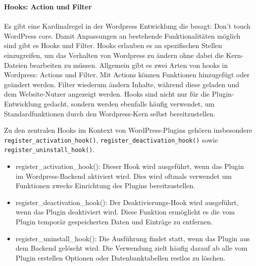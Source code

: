 \newpage
\textbf{Hooks: Action und Filter}\\\\
Es gibt eine Kardinalregel in der Wordpress Entwicklung die besagt: Don’t touch WordPress core. %
Damit Anpassungen an bestehende Funktionalitäten möglich sind gibt es Hooks und Filter.
Hooks erlauben es an spezifischen Stellen einzugreifen, um das Verhalten von Wordpress zu ändern ohne dabei die Kern-Dateien bearbeiten zu müssen.
Allgemein gibt es zwei Arten von hooks in Wordpress: Actions und Filter.
Mit Actions können Funktionen hinzugefügt oder geändert werden.
Filter wiederum ändern Inhalte, während diese geladen und dem Website-Nutzer angezeigt werden.
Hooks sind nicht nur für die Plugin-Entwicklung gedacht, sondern werden ebenfalls häufig verwendet, um Standardfunktionen durch den Wordpress-Kern selbst bereitzustellen.

Zu den zentralen Hooks im Kontext von WordPress-Plugins gehören insbesondere \texttt{register\_activation\_hook()}, \texttt{register\_deactivation\_hook()} sowie \texttt{register\_uninstall\_hook()}.

\begin{itemize}
 \item register\_activation\_hook(): Dieser Hook wird ausgeführt, wenn das Plugin im Wordpress-Backend aktiviert wird. Dies wird oftmals verwendet um Funktionen zwecks Einrichtung des Plugins bereitzustellen.
 \item register\_deactivation\_hook(): Der Deaktivierungs-Hook wird ausgeführt, wenn das Plugin deaktiviert wird. Diese Funktion ermöglicht es die vom Plugin temporär gespeicherten Daten und Einträge zu entfernen.
 \item register\_uninstall\_hook(): Die Ausführung findet statt, wenn das Plugin aus dem Backend gelöscht wird. Die Verwendung zielt häufig darauf ab alle vom Plugin erstellen Optionen oder Datenbanktabellen restlos zu löschen.
\end{itemize}






